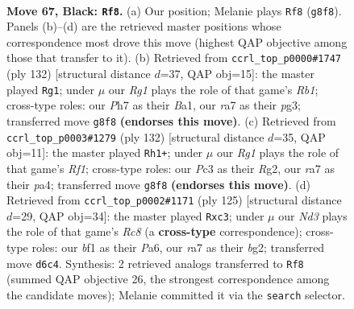 \documentclass[11pt]{article}
\begin{document}
\clearpage

\begin{figure}[p]\centering
\begin{subfigure}{0.46\textwidth}\centering
\resizebox{\linewidth}{!}{%
\newchessgame
\chessboard[
  setfen={3k2r1/R6p/P2n4/8/2P5/2p4P/2P1K1P1/5B2 b - - 4 67},
  showmover=false,
  pgfstyle=straightmove, color=movearrow, markmove={g8-f8}
]}
\caption{}
\end{subfigure}\hfill
\begin{subfigure}{0.46\textwidth}\centering
\resizebox{\linewidth}{!}{%
\newchessgame
\chessboard[
  setfen={8/4b1p1/2p1P2k/p3N2P/r1p5/4K1p1/8/BR6 w - - 0 67},
  showmover=false,
  pgfstyle=straightmove, color=movearrow, markmove={b1-g1}
]}
\caption{}
\end{subfigure}
\\[4pt]
\begin{subfigure}{0.46\textwidth}\centering
\resizebox{\linewidth}{!}{%
\newchessgame
\chessboard[
  setfen={8/5p1p/4b3/6Pk/p1r5/K1P5/6R1/5R2 w - - 51 67},
  showmover=false,
  pgfstyle=straightmove, color=movearrow, markmove={f1-h1}
]}
\caption{}
\end{subfigure}\hfill
\begin{subfigure}{0.46\textwidth}\centering
\resizebox{\linewidth}{!}{%
\newchessgame
\chessboard[
  setfen={8/3k4/p7/8/1Pp4R/2Pn3P/6BK/2r5 b - - 0 63},
  showmover=false,
  pgfstyle=straightmove, color=movearrow, markmove={c1-c3}
]}
\caption{}
\end{subfigure}
\caption{\textbf{Move 67, Black: \texttt{Rf8}.} (a) Our position; Melanie plays \texttt{Rf8} (\texttt{g8f8}). Panels (b)--(d) are the retrieved master positions whose correspondence most drove this move (highest QAP objective among those that transfer to it). (b) Retrieved from \texttt{ccrl\_top\_p0000\#1747} (ply 132) [structural distance $d$=37, QAP obj=15]: the master played \texttt{Rg1}; under $\mu$ our \emph{Rg1} plays the role of that game's \emph{Rb1}; cross-type roles: our \emph{P}h7 as their \emph{B}a1, our \emph{r}a7 as their \emph{p}g3; transferred move \texttt{g8f8} \textbf{(endorses this move)}. (c) Retrieved from \texttt{ccrl\_top\_p0003\#1279} (ply 132) [structural distance $d$=35, QAP obj=11]: the master played \texttt{Rh1+}; under $\mu$ our \emph{Rg1} plays the role of that game's \emph{Rf1}; cross-type roles: our \emph{P}c3 as their \emph{R}g2, our \emph{r}a7 as their \emph{p}a4; transferred move \texttt{g8f8} \textbf{(endorses this move)}. (d) Retrieved from \texttt{ccrl\_top\_p0002\#1171} (ply 125) [structural distance $d$=29, QAP obj=34]: the master played \texttt{Rxc3}; under $\mu$ our \emph{Nd3} plays the role of that game's \emph{Rc8} (a \textbf{cross-type} correspondence); cross-type roles: our \emph{b}f1 as their \emph{P}a6, our \emph{r}a7 as their \emph{b}g2; transferred move \texttt{d6c4}. Synthesis: 2 retrieved analogs transferred to \texttt{Rf8} (summed QAP objective 26, the strongest correspondence among the candidate moves); Melanie committed it via the \texttt{search} selector.}
\label{fig:thought-m133}
\end{figure}
\end{document}
